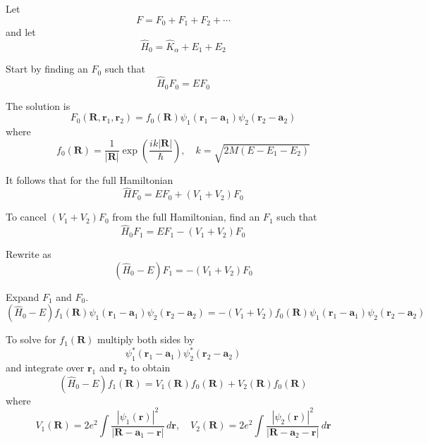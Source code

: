 \documentclass[12pt]{article}
\begin{document}
Let
\begin{equation*}
F=F_0+F_1+F_2+\cdots
\end{equation*}
and let
\begin{equation*}
\hat H_0=\hat K_\alpha+E_1+E_2
\end{equation*}

Start by finding an $F_0$ such that
\begin{equation*}
\hat H_0F_0=EF_0
\end{equation*}

The solution is
\begin{equation*}
F_0(\mathbf R,\mathbf r_1,\mathbf r_2)=f_0(\mathbf R)\psi_1(\mathbf r_1-\mathbf a_1)\psi_2(\mathbf r_2-\mathbf a_2)
\tag{1}
\end{equation*}
where
\begin{equation*}
f_0(\mathbf R)=\frac{1}{|\mathbf R|}\exp\left(\frac{ik|\mathbf R|}{\hbar}\right),\quad k=\sqrt{2M(E-E_1-E_2)}
\end{equation*}

It follows that for the full Hamiltonian
\begin{equation*}
\hat HF_0=EF_0+(V_1+V_2)F_0
\end{equation*}

To cancel $(V_1+V_2)F_0$ from the full Hamiltonian, find an $F_1$ such that
\begin{equation*}
\hat H_0F_1=EF_1-(V_1+V_2)F_0
\end{equation*}

Rewrite as
\begin{equation*}
\left(\hat H_0-E\right)F_1=-(V_1+V_2)F_0
\end{equation*}

Expand $F_1$ and $F_0$.
\begin{equation*}
\left(\hat H_0-E\right)f_1(\mathbf R)\psi_1(\mathbf r_1-\mathbf a_1)\psi_2(\mathbf r_2-\mathbf a_2)
=-(V_1+V_2)f_0(\mathbf R)\psi_1(\mathbf r_1-\mathbf a_1)\psi_2(\mathbf r_2-\mathbf a_2)
\end{equation*}

To solve for $f_1(\mathbf R)$ multiply both sides by
\begin{equation*}
\psi_1^*(\mathbf r_1-\mathbf a_1)\psi_2^*(\mathbf r_2-\mathbf a_2)
\end{equation*}
and integrate over $\mathbf r_1$ and $\mathbf r_2$ to obtain
\begin{equation*}
\left(\hat H_0-E\right)f_1(\mathbf R)
=V_1(\mathbf R)f_0(\mathbf R)+V_2(\mathbf R)f_0(\mathbf R)
\tag{2}
\end{equation*}
where
\begin{equation*}
V_1(\mathbf R)=
2e^2\int\frac{|\psi_1(\mathbf r)|^2}{|\mathbf R-\mathbf a_1-\mathbf r|}\,d\mathbf r,
\quad
V_2(\mathbf R)=
2e^2\int\frac{|\psi_2(\mathbf r)|^2}{|\mathbf R-\mathbf a_2-\mathbf r|}\,d\mathbf r
\end{equation*}
\end{document}
